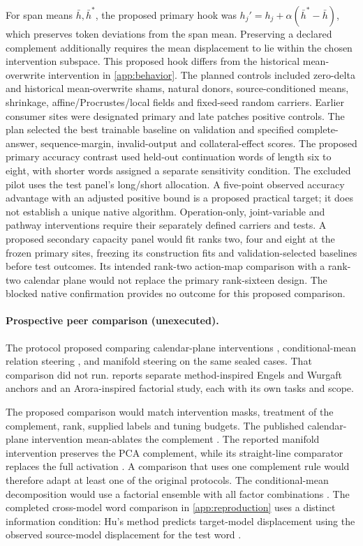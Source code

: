 For span means $\bar h,\bar h^*$, the proposed primary hook was $h_j'=h_j+\alpha(\bar h^*-\bar h)$, which preserves token deviations from the span mean. Preserving a declared complement additionally requires the mean displacement to lie within the chosen intervention subspace. This proposed hook differs from the historical mean-overwrite intervention in \cref{app:behavior}. The planned controls included zero-delta and historical mean-overwrite shams, natural donors, source-conditioned means, shrinkage, affine/Procrustes/local fields and fixed-seed random carriers. Earlier consumer sites were designated primary and late patches positive controls. The plan selected the best trainable baseline on validation and specified complete-answer, sequence-margin, invalid-output and collateral-effect scores. The proposed primary accuracy contrast used held-out continuation words of length six to eight, with shorter words assigned a separate sensitivity condition. The excluded pilot uses the test panel's long/short allocation. A five-point observed accuracy advantage with an adjusted positive bound is a proposed practical target; it does not establish a unique native algorithm. Operation-only, joint-variable and pathway interventions require their separately defined carriers and tests. A proposed secondary capacity panel would fit ranks two, four and eight at the frozen primary sites, freezing its construction fits and validation-selected baselines before test outcomes. Its intended rank-two action-map comparison with a rank-two calendar plane would not replace the primary rank-sixteen design. The blocked native confirmation provides no outcome for this proposed comparison.

\paragraph{Prospective peer comparison (unexecuted).}
The protocol proposed comparing calendar-plane interventions \citep{engels2025notall}, conditional-mean relation steering \citep{arora2026causal}, and manifold steering \citep{wurgaft2026manifold} on the same sealed cases. That comparison did not run.  reports separate method-inspired Engels and Wurgaft anchors and an Arora-inspired factorial study, each with its own tasks and scope.

The proposed comparison would match intervention masks, treatment of the complement, rank, supplied labels and tuning budgets. The published calendar-plane intervention mean-ablates the complement \citep[Section~5.1]{engels2025notall}. The reported manifold intervention preserves the PCA complement, while its straight-line comparator replaces the full activation \citep[Appendix~A.6]{wurgaft2026manifold}. A comparison that uses one complement rule would therefore adapt at least one of the original protocols. The conditional-mean decomposition would use a factorial ensemble with all factor combinations \citep[Section~2]{arora2026causal}. The completed cross-model word comparison in \cref{app:reproduction} uses a distinct information condition: Hu's method predicts target-model displacement using the observed source-model displacement for the test word \citep[Equation~12]{hu2026language}.

